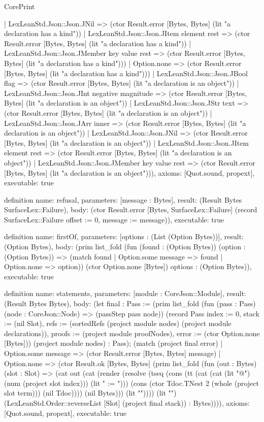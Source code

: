 \begin{lexlean}{CorePrint}
\begin{semanticmodule}
{        | LexLeanStd.Json::Json.JNil => (ctor Result.error [Bytes, Bytes] (lit "a declaration has a kind"))
        | LexLeanStd.Json::Json.JItem element rest => (ctor Result.error [Bytes, Bytes] (lit "a declaration has a kind"))
        | LexLeanStd.Json::Json.JMember key value rest => (ctor Result.error [Bytes, Bytes] (lit "a declaration has a kind")))
      | Option.none => (ctor Result.error [Bytes, Bytes] (lit "a declaration has a kind")))
    | LexLeanStd.Json::Json.JBool flag => (ctor Result.error [Bytes, Bytes] (lit "a declaration is an object"))
    | LexLeanStd.Json::Json.JInt negative magnitude => (ctor Result.error [Bytes, Bytes] (lit "a declaration is an object"))
    | LexLeanStd.Json::Json.JStr text => (ctor Result.error [Bytes, Bytes] (lit "a declaration is an object"))
    | LexLeanStd.Json::Json.JArr inner => (ctor Result.error [Bytes, Bytes] (lit "a declaration is an object"))
    | LexLeanStd.Json::Json.JNil => (ctor Result.error [Bytes, Bytes] (lit "a declaration is an object"))
    | LexLeanStd.Json::Json.JItem element rest => (ctor Result.error [Bytes, Bytes] (lit "a declaration is an object"))
    | LexLeanStd.Json::Json.JMember key value rest => (ctor Result.error [Bytes, Bytes] (lit "a declaration is an object"))),
  axioms: [Quot.sound, propext],
  executable: true
}

definition{
  name: refusal,
  parameters: [message : Bytes],
  result: (Result Bytes SurfaceLex::Failure),
  body: (ctor Result.error [Bytes, SurfaceLex::Failure] (record SurfaceLex::Failure {offset := 0, message := message})),
  executable: true
}

definition{
  name: firstOf,
  parameters: [options : (List (Option Bytes))],
  result: (Option Bytes),
  body: (prim list_fold (fun (found : (Option Bytes)) (option : (Option Bytes)) => (match found
    | Option.some message => found
    | Option.none => option)) (ctor Option.none [Bytes]) options : (Option Bytes)),
  executable: true
}

definition{
  name: statements,
  parameters: [module : CoreJson::Module],
  result: (Result Bytes Bytes),
  body: (let final : Pass := (prim list_fold (fun (pass : Pass) (node : CoreJson::Node) => (passStep pass node)) (record Pass {index := 0, stack := (nil Slot), refs := (sortedRefs (project module nodes) (project module declarations)), proofs := (project module proofNodes), error := (ctor Option.none [Bytes])}) (project module nodes) : Pass); (match (project final error)
    | Option.some message => (ctor Result.error [Bytes, Bytes] message)
    | Option.none => (ctor Result.ok [Bytes, Bytes] (prim list_fold (fun (out : Bytes) (slot : Slot) => (cat out (cat (render (resolve (tseq (cons (tt (cat (cat (lit "@") (num (project slot index))) (lit " := "))) (cons (ctor Tdoc.TNest 2 (whole (project slot term))) (nil Tdoc)))) (nil Bytes))) (lit "\n")))) (lit "") (LexLeanStd.Order::reverseList [Slot] (project final stack)) : Bytes)))),
  axioms: [Quot.sound, propext],
  executable: true
}


\end{semanticmodule}
\end{lexlean}
